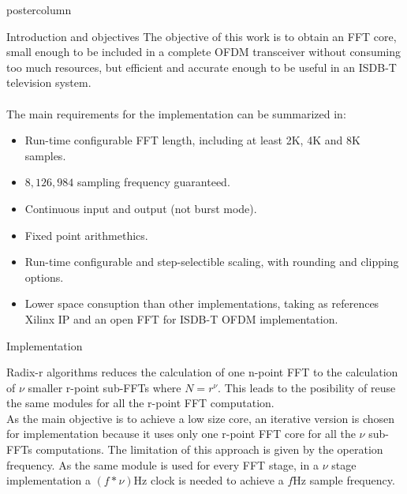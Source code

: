 \documentclass[final]{beamer}
\begin{document}
\begin{frame}{}
\begin{columns}
\begin{column}{.5\textwidth}
\begin{beamercolorbox}[center,wd=0.9\textwidth]{postercolumn}
\begin{minipage}[T]{.99\textwidth}
{\begin{block}{Introduction and objectives}
			The objective of this work is to obtain an FFT core, small enough to be included in a complete OFDM transceiver without consuming 
			too much resources, but efficient and accurate enough to be useful in an ISDB-T television system.\\
			~\\
			The main requirements for the implementation can be summarized in:
%
			\begin{itemize}
			  \item Run-time configurable FFT length, including at least 2K, 4K and 8K samples.
			  \item $8,126,984$ sampling frequency guaranteed.
			  \item Continuous input and output (not burst mode).
			  \item Fixed point arithmethics.
			  \item Run-time configurable and step-selectible scaling, with rounding and clipping options.
			  \item Lower space consuption than other implementations, taking as references Xilinx IP and an open FFT for ISDB-T OFDM implementation.
			\end{itemize}
			
        \end{block}


	    \begin{block}{Implementation}
	    	\justify
	    	
			Radix-r algorithms reduces the calculation of one n-point FFT to the calculation of $\nu$ smaller r-point sub-FFTs where $N = r^\nu$. This leads to the posibility of
			reuse the same modules for all the r-point FFT computation.\\
			
			As the main objective is to achieve a low size core, an iterative version is chosen for implementation because it uses only one r-point FFT core for all the
			$\nu$ sub-FFTs computations. The limitation of this approach is given by the operation frequency. As the same module is used for every FFT stage, in a $\nu$ stage
			implementation a $(f*\nu)$Hz clock is needed to achieve a $f$Hz sample frequency.\\  
			  

\end{block}}
\end{minipage}
\end{beamercolorbox}
\end{column}
\end{columns}
\end{frame}
\end{document}
